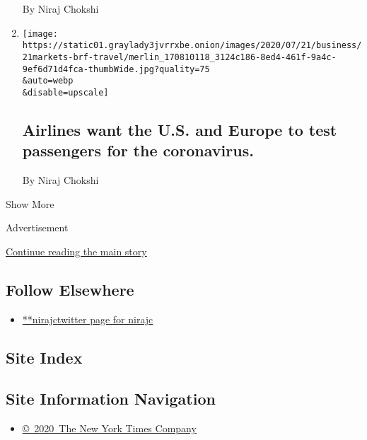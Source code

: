 \begin{enumerate}
  By Niraj Chokshi
\item
  \href{/live/2020/07/21/business/stock-market-today-coronavirus/airlines-want-the-us-and-europe-to-test-passengers-for-the-coronavirus}{}

  \texttt{[image: https://static01.graylady3jvrrxbe.onion/images/2020/07/21/business/21markets-brf-travel/merlin\_170810118\_3124c186-8ed4-461f-9a4c-9ef6d71d4fca-thumbWide.jpg?quality=75\\\&auto=webp\\\&disable=upscale]}

  \hypertarget{airlines-want-the-us-and-europe-to-test-passengers-for-the-coronavirus}{%
  \subsection{Airlines want the U.S. and Europe to test passengers for
  the
  coronavirus.}\label{airlines-want-the-us-and-europe-to-test-passengers-for-the-coronavirus}}

  By Niraj Chokshi
\end{enumerate}

Show More

Advertisement

\protect\hyperlink{after-mid2}{Continue reading the main story}

\hypertarget{follow-elsewhere}{%
\subsection{Follow Elsewhere}\label{follow-elsewhere}}

\begin{itemize}
\tightlist
\item
  \href{https://twitter.com/nirajc}{**nirajctwitter page for nirajc}
\end{itemize}

\hypertarget{site-index}{%
\subsection{Site Index}\label{site-index}}

\hypertarget{site-information-navigation}{%
\subsection{Site Information
Navigation}\label{site-information-navigation}}

\begin{itemize}
\tightlist
\item
  \href{https://help.nytimes3xbfgragh.onion/hc/en-us/articles/115014792127-Copyright-notice}{©~2020~The
  New York Times Company}
\end{itemize}

